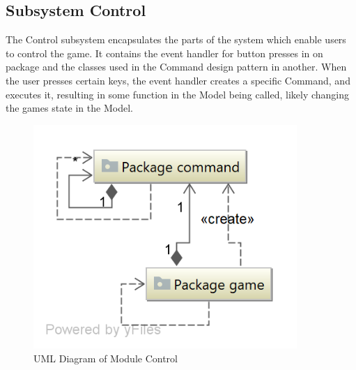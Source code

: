 \subsection{Subsystem Control}
The Control subsystem encapsulates the parts of the system which enable users to control the game. It contains the event handler for button presses in on package and the classes used in the Command design pattern in another. When the user presses certain keys, the event handler creates a specific Command, and executes it, resulting in some function in the Model being called, likely changing the games state in the Model.

\begin{figure}[H]
\centering
\includegraphics[width=10cm]{Source/Module/Control/Control.png}
\caption{UML Diagram of Module Control}
\label{Control}
\end{figure}


